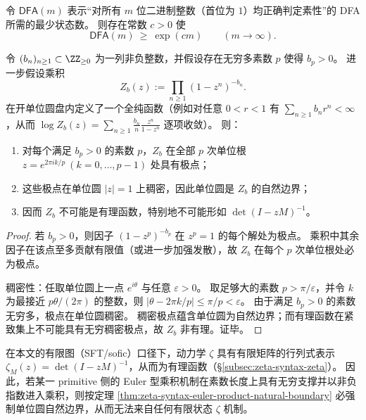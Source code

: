 \begin{conjecture}[素数识别的状态复杂度必须指数增长]\label{conj:zeta-syntax-prime-dfa-exponential}
令 \(\mathsf{DFA}(m)\) 表示“对所有 \(m\) 位二进制整数（首位为 \(1\)）均正确判定素性”的 DFA 所需的最少状态数。
则存在常数 \(c>0\) 使
\[
\mathsf{DFA}(m)\ \ge\ \exp(c m)\qquad(m\to\infty).
\]
\end{conjecture}

\begin{theorem}\label{thm:zeta-syntax-euler-product-natural-boundary}
令 \((b_n)_{n\ge 1}\subset\ZZ_{\ge 0}\) 为一列非负整数，并假设存在无穷多素数 \(p\) 使得 \(b_p>0\)。
进一步假设乘积
\[
Z_b(z):=\prod_{n\ge 1}(1-z^n)^{-b_n}.
\]
在开单位圆盘内定义了一个全纯函数（例如对任意 \(0<r<1\) 有 \(\sum_{n\ge 1}b_n r^n<\infty\)，从而 \(\log Z_b(z)=\sum_{n\ge 1}\frac{b_n}{n}\frac{z^n}{1-z^n}\) 逐项收敛）。
则：
\begin{enumerate}
  \item 对每个满足 \(b_p>0\) 的素数 \(p\)，\(Z_b\) 在全部 \(p\) 次单位根 \(z=e^{2\pi i k/p}\ (k=0,\dots,p-1)\) 处具有极点；
  \item 这些极点在单位圆 \(|z|=1\) 上稠密，因此单位圆是 \(Z_b\) 的自然边界；
  \item 因而 \(Z_b\) 不可能是有理函数，特别地不可能形如 \(\det(I-zM)^{-1}\)。
\end{enumerate}
\end{theorem}
\begin{proof}
若 \(b_p>0\)，则因子 \((1-z^p)^{-b_p}\) 在 \(z^p=1\) 的每个解处为极点。
乘积中其余因子在该点至多贡献有限值（或进一步加强发散），故 \(Z_b\) 在每个 \(p\) 次单位根处必为极点。
\par
稠密性：任取单位圆上一点 \(e^{i\theta}\) 与任意 \(\varepsilon>0\)。
取足够大的素数 \(p>\pi/\varepsilon\)，并令 \(k\) 为最接近 \(p\theta/(2\pi)\) 的整数，则
\(
|\theta-2\pi k/p|\le \pi/p<\varepsilon
\)。
由于满足 \(b_p>0\) 的素数无穷多，极点在单位圆稠密。
稠密极点蕴含单位圆为自然边界；而有理函数在紧致集上不可能具有无穷稠密极点，故 \(Z_b\) 非有理。证毕。
\end{proof}

\begin{remark}\label{rem:zeta-syntax-natural-boundary-obstruction}
在本文的有限图（SFT/sofic）口径下，动力学 \(\zeta\) 具有有限矩阵的行列式表示 \(\zeta_M(z)=\det(I-zM)^{-1}\)，从而为有理函数（\S\ref{subsec:zeta-syntax-zeta}）。
因此，若某一 primitive 侧的 Euler 型乘积机制在素数长度上具有无穷支撑并以非负指数进入乘积，则按定理 \ref{thm:zeta-syntax-euler-product-natural-boundary} 必强制单位圆自然边界，从而无法来自任何有限状态 \(\zeta\) 机制。
\end{remark}


